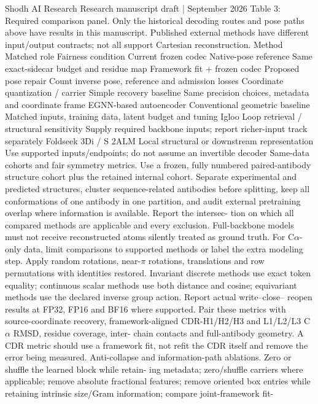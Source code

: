 \documentclass[11pt]{article}
\begin{document}
Shodh AI Research Research manuscript draft | September 2026
Table 3: Required comparison panel. Only the historical decoding routes and pose paths above have
results in this manuscript. Published external methods have different input/output contracts; not all
support Cartesian reconstruction.
Method Matched role Fairness condition
Current frozen codec Native-pose reference Same exact-sidecar budget and
residue map
Framework fit + frozen
codec
Proposed pose repair Count inverse pose, reference and
admission losses
Coordinate quantization
/ carrier
Simple recovery baseline Same precision choices, metadata and
coordinate frame
EGNN-based
autoencoder
Conventional geometric baseline Matched inputs, training data, latent
budget and tuning
Igloo Loop retrieval / structural sensitivity Supply required backbone inputs;
report richer-input track separately
Foldseek 3Di / S 2ALM Local structural or downstream
representation
Use supported inputs/endpoints; do
not assume an invertible decoder
Same-data cohorts and fair symmetry metrics. Use a frozen, fully numbered paired-antibody
structure cohort plus the retained internal cohort. Separate experimental and predicted structures,
cluster sequence-related antibodies before splitting, keep all conformations of one antibody in one
partition, and audit external pretraining overlap where information is available. Report the intersec-
tion on which all compared methods are applicable and every exclusion. Full-backbone models must
not receive reconstructed atoms silently treated as ground truth. For C\ensuremath{\alpha}-only data, limit comparisons
to supported methods or label the extra modeling step.
Apply random rotations, near-\ensuremath{\pi} rotations, translations and row permutations with identities restored.
Invariant discrete methods use exact token equality; continuous scalar methods use both distance
and cosine; equivariant methods use the declared inverse group action. Report actual write–close–
reopen results at FP32, FP16 and BF16 where supported. Pair these metrics with source-coordinate
recovery, framework-aligned CDR-H1/H2/H3 and L1/L2/L3 C \ensuremath{\alpha} RMSD, residue coverage, inter-
chain contacts and full-antibody geometry. A CDR metric should use a framework fit, not refit the
CDR itself and remove the error being measured.
Anti-collapse and information-path ablations. Zero or shuffle the learned block while retain-
ing metadata; zero/shuffle carriers where applicable; remove absolute fractional features; remove
oriented box entries while retaining intrinsic size/Gram information; compare joint-framework fit-
\end{document}
